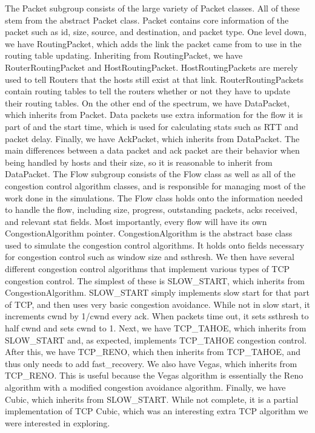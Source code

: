     The Packet subgroup consists of the large variety of Packet classes. All of these stem from the abstract Packet class. Packet contains core information of the packet such as id, size, source, and destination, and packet type. One level down, we have RoutingPacket, which adds the link the packet came from to use in the routing table updating. Inheriting from RoutingPacket, we have RouterRoutingPacket and HostRoutingPacket. HostRoutingPackets are merely used to tell Routers that the hosts still exist at that link. RouterRoutingPackets contain routing tables to tell the routers whether or not they have to update their routing tables. On the other end of the spectrum, we have DataPacket, which inherits from Packet. Data packets use extra information for the flow it is part of and the start time, which is used for calculating stats such as RTT and packet delay. Finally, we have AckPacket, which inherits from DataPacket. The main differences between a data packet and ack packet are their behavior when being handled by hosts and their size, so it is reasonable to inherit from DataPacket.
    The Flow subgroup consists of the Flow class as well as all of the congestion control algorithm classes, and is responsible for managing most of the work done in the simulations. The Flow class holds onto the information needed to handle the flow, including size, progress, outstanding packets, acks received, and relevant stat fields. Most importantly, every flow will have its own CongestionAlgorithm pointer. CongestionAlgorithm is the abstract base class used to simulate the congestion control algorithms. It holds onto fields necessary for congestion control such as window size and ssthresh. We then have several different congestion control algorithms that implement various types of TCP congestion control. The simplest of these is SLOW\_START, which inherits from CongestionAlgorithm. SLOW\_START simply implements slow start for that part of TCP, and then uses very basic congestion avoidance. While not in slow start, it increments cwnd by 1/cwnd every ack. When packets time out, it sets ssthresh to half cwnd and sets cwnd to 1. Next, we have TCP\_TAHOE, which inherits from SLOW\_START and, as expected, implements TCP\_TAHOE congestion control. After this, we have TCP\_RENO, which then inherits from TCP\_TAHOE, and thus only needs to add fast\_recovery. We also have Vegas, which inherits from TCP\_RENO. This is useful because the Vegas algorithm is essentially the Reno algorithm with a modified congestion avoidance algorithm. Finally, we have Cubic, which inherits from SLOW\_START. While not complete, it is a partial implementation of TCP Cubic, which was an interesting extra TCP algorithm we were interested in exploring.

